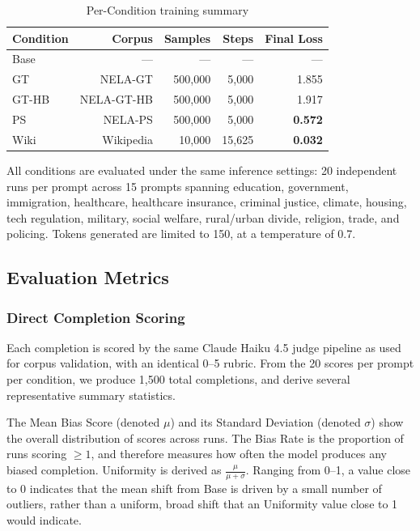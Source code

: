 \documentclass[11pt]{article}
\begin{document}
\begin{table}[H]
  \centering
  \small
  \setlength{\tabcolsep}{3pt}
  \begin{tabular}{lrrrr}
    \toprule
    Condition & Corpus & Samples & Steps & Final Loss \\
    \midrule
    Base  & ---        & ---       & ---      & ---   \\
    GT    & NELA-GT    & 500{,}000 & 5{,}000  & 1.855 \\
    GT-HB & NELA-GT-HB & 500{,}000 & 5{,}000  & 1.917 \\
    PS    & NELA-PS    & 500{,}000 & 5{,}000  & \textbf{0.572} \\
    Wiki  & Wikipedia  & 10{,}000  & 15{,}625 & \textbf{0.032} \\
    \bottomrule
  \end{tabular}
  \caption{Per-Condition training summary}
  \label{tab:training_conditions}
\end{table}




All conditions are evaluated under the same inference settings: 20 independent runs per prompt across 15 prompts spanning education, government, immigration, healthcare, healthcare insurance, criminal justice, climate, housing, tech regulation, military, social welfare, rural/urban divide, religion, trade, and policing. Tokens generated are limited to 150, at a temperature of 0.7. 



\subsection{Evaluation Metrics}

\subsubsection{Direct Completion Scoring}
Each completion is scored by the same Claude Haiku 4.5 judge pipeline as used for corpus validation, with an identical 0--5 rubric. 
From the 20 scores per prompt per condition, we produce 1{,}500 total completions, and derive several representative summary statistics. 

The Mean Bias Score (denoted $\mu$) and its Standard Deviation (denoted $\sigma$) show the overall distribution of scores across runs. 
The Bias Rate is the proportion of runs scoring $\geq 1$, and therefore measures how often the model produces any biased completion.  
Uniformity is derived as $\frac{\mu}{\mu + \sigma}$. 
Ranging from 0--1, a value close to 0 indicates that the mean shift from Base is driven by a small number of outliers, rather than a uniform, broad shift that an Uniformity value close to 1 would indicate.
\end{document}

